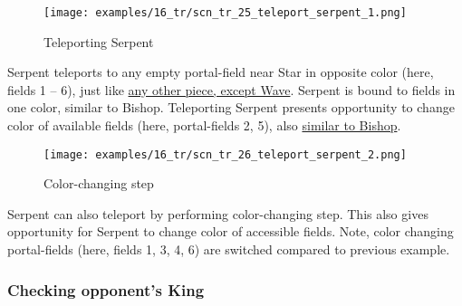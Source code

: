 \vspace*{-1.0\baselineskip}
\noindent
\begin{figure}[!h]
\texttt{[image: examples/16\_tr/scn\_tr\_25\_teleport\_serpent\_1.png]}
\caption{Teleporting Serpent}
\label{fig:scn_tr_25_teleport_serpent_1}
\end{figure}

Serpent teleports to any empty portal-field near Star in opposite color
(here, fields 1 -- 6), just like
\hyperref[fig:scn_n_02_teleport_init]{any other piece, except Wave}.
Serpent is bound to fields in one color, similar to Bishop. Teleporting
Serpent presents opportunity to change color of available fields (here,
portal-fields 2, 5), also
\hyperref[fig:scn_n_14_teleport_bishop]{similar to Bishop}.

\clearpage %

\vspace*{-1.0\baselineskip}
\noindent
\begin{figure}[!h]
\texttt{[image: examples/16\_tr/scn\_tr\_26\_teleport\_serpent\_2.png]}
\caption{Color-changing step}
\label{fig:scn_tr_26_teleport_serpent_2}
\end{figure}

Serpent can also teleport by performing color-changing step. This also
gives opportunity for Serpent to change color of accessible fields. Note,
color changing portal-fields (here, fields 1, 3, 4, 6) are switched
compared to previous example.

\clearpage %

\subsubsection*{Checking opponent's King}
\label{sec:Tamoanchan Revisited/Serpent/Movement/Checking opponent's King}

